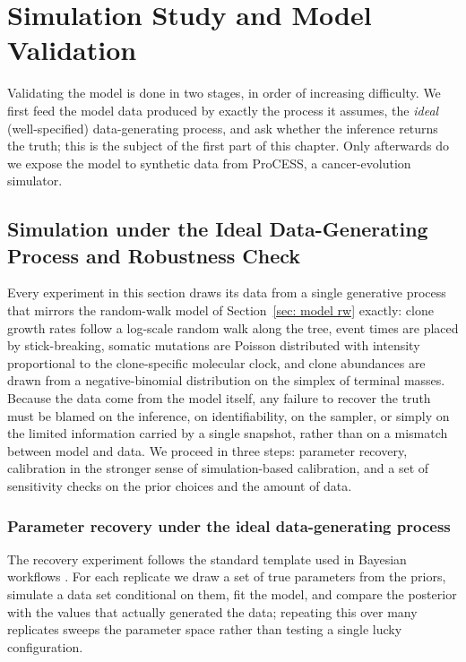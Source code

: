 \chapter{Simulation Study and Model Validation}

Validating the model is done in two stages, in order of increasing difficulty.
We first feed the model data produced by exactly the process it assumes, the
\emph{ideal} (well-specified) data-generating process, and ask whether the
inference returns the truth; this is the subject of the first part of this chapter.
Only afterwards do we expose the model to synthetic data from ProCESS, a
cancer-evolution simulator.

\section{Simulation under the Ideal Data-Generating Process and Robustness Check}

Every experiment in this section draws its data from a single generative process
that mirrors the random-walk model of Section~\ref{sec: model rw} exactly: clone
growth rates follow a log-scale random walk along the tree, event times are placed
by stick-breaking, somatic mutations are Poisson distributed with intensity
proportional to the clone-specific molecular clock, and clone abundances are drawn
from a negative-binomial distribution on the simplex of terminal masses. Because
the data come from the model itself, any failure to recover the truth must be
blamed on the inference, on identifiability, on the sampler, or simply on the
limited information carried by a single snapshot, rather than on a mismatch
between model and data. We proceed in three steps: parameter recovery, calibration
in the stronger sense of simulation-based calibration, and a set of sensitivity
checks on the prior choices and the amount of data.

\subsection{Parameter recovery under the ideal data-generating process}

The recovery experiment follows the standard template used in Bayesian workflows
\parencite{schad2021toward}. For each replicate we draw a set of true parameters
from the priors, simulate a data set conditional on them, fit the model, and
compare the posterior with the values that actually generated the data; repeating
this over many replicates sweeps the parameter space rather than testing a single
lucky configuration.

